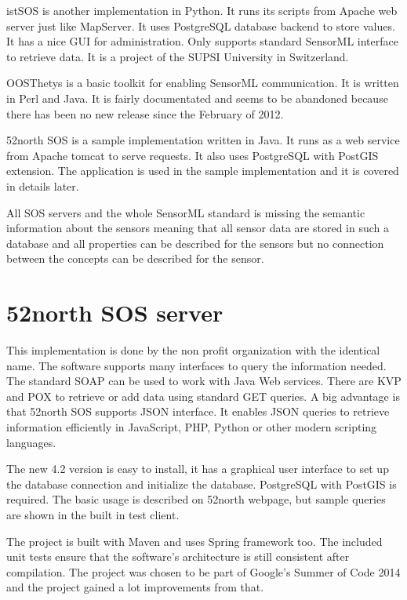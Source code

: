 istSOS is another implementation in Python\cite{istsos}. It runs its scripts from Apache web server just like MapServer. It uses PostgreSQL database backend to store values. It has a nice GUI for administration. Only supports standard SensorML interface to retrieve data. It is a project of the SUPSI University in Switzerland.

OOSThetys is a basic toolkit for enabling SensorML communication. It is written in Perl and Java. It is fairly documentated and seems to be abandoned because there has been no new release since the February of 2012.

52north SOS is a sample implementation written in Java\cite{52north}. It runs as a web service from Apache tomcat to serve requests. It also uses PostgreSQL with PostGIS extension. The application is used in the sample implementation and it is covered in details later.

All SOS servers and the whole SensorML standard is missing the semantic information about the sensors meaning that all sensor data are stored in such a database and all properties can be described for the sensors but no connection between the concepts can be described for the sensor.

\section{52north SOS server}

This implementation is done by the non profit organization with the identical name. The software supports many interfaces to query the information needed. The standard SOAP can be used to work with Java Web services. There are KVP and POX to retrieve or add data using standard GET queries. A big advantage is that 52north SOS supports JSON interface. It enables JSON queries to retrieve information efficiently in JavaScript, PHP, Python or other modern scripting languages.

The new 4.2 version is easy to install, it has a graphical user interface to set up the database connection and initialize the database. PostgreSQL with PostGIS is required.  The basic usage is described on  52north webpage, but sample queries are shown in the built in test client. 

The project is built with Maven and uses Spring framework too. The included unit tests ensure that the software's architecture is still consistent after compilation. The project was chosen to be part of Google's Summer of Code 2014 and the project gained a lot improvements from that. 

